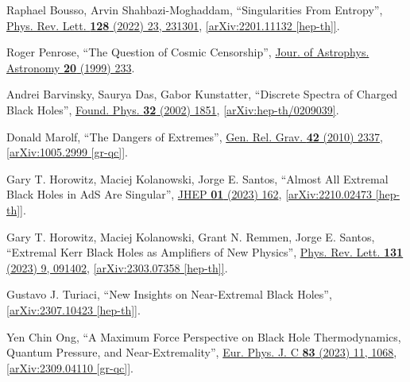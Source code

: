 \documentclass[12pt,preprintnumbers, floatfix, preprintnumbers, letterpaper, superscriptaddress,nofootinbib]{revtex4-2}
\begin{document}
\begin{thebibliography}{99}
Raphael Bousso, Arvin Shahbazi-Moghaddam, ``Singularities From Entropy'', {\hypersetup{urlcolor=vividviolet}\href{Phys.Rev.Lett. 128 (2022) 23, 231301}{Phys. Rev. Lett. \textbf{128} (2022) 23, 231301}}, \href{https://arxiv.org/abs/2201.11132}{[arXiv:2201.11132 [hep-th]]}.

Roger Penrose, ``The Question of Cosmic Censorship'',
{\hypersetup{urlcolor=vividviolet}\href{https://adsabs.harvard.edu/full/1999JApA...20..233P}{Jour. of Astrophys. Astronomy \textbf{20} (1999) 233}}.

Andrei Barvinsky, Saurya Das, Gabor Kunstatter, ``Discrete Spectra of Charged Black Holes'', {\hypersetup{urlcolor=vividviolet}\href{https://link.springer.com/article/10.1023/A:1022314632647}{Found. Phys. \textbf{32} (2002) 1851}}, \href{https://arxiv.org/abs/hep-th/0209039}{[arXiv:hep-th/0209039]}.

Donald Marolf, ``The Dangers of Extremes'', {\hypersetup{urlcolor=vividviolet}\href{https://link.springer.com/article/10.1007/s10714-010-1027-z}{Gen. Rel. Grav. \textbf{42} (2010) 2337}}, \href{https://arxiv.org/abs/1005.2999}{[arXiv:1005.2999 [gr-qc]]}.

Gary T. Horowitz, Maciej Kolanowski, Jorge E. Santos, ``Almost All Extremal Black Holes in AdS Are Singular'', {\hypersetup{urlcolor=vividviolet}\href{https://link.springer.com/article/10.1007/JHEP01(2023)162}{JHEP \textbf{01} (2023) 162}}, \href{https://arxiv.org/abs/2210.02473}{[arXiv:2210.02473 [hep-th]]}. 

Gary T. Horowitz, Maciej Kolanowski, Grant N. Remmen, Jorge E. Santos, ``Extremal Kerr Black Holes as Amplifiers of New Physics'', {\hypersetup{urlcolor=vividviolet}\href{https://journals.aps.org/prl/abstract/10.1103/PhysRevLett.131.091402}{Phys. Rev. Lett. \textbf{131} (2023) 9, 091402}}, \href{https://arxiv.org/abs/2303.07358}{[arXiv:2303.07358 [hep-th]]}.

Gustavo J. Turiaci, ``New Insights on Near-Extremal Black Holes'', \href{https://arxiv.org/abs/2307.10423}{[arXiv:2307.10423 [hep-th]]}.

Yen Chin Ong, ``A Maximum Force Perspective on Black Hole Thermodynamics, Quantum Pressure, and Near-Extremality'', {\hypersetup{urlcolor=vividviolet}\href{https://link.springer.com/article/10.1140/epjc/s10052-023-12253-9}{Eur. Phys. J. C \textbf{83} (2023) 11, 1068}}, \href{https://arxiv.org/abs/2309.04110}{[arXiv:2309.04110 [gr-qc]]}.


\end{thebibliography}
\end{document}
